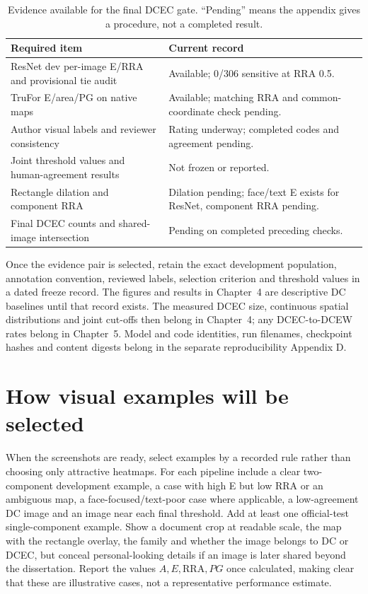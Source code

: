 \begin{table}[htbp]
\centering\small
\caption{Evidence available for the final DCEC gate. ``Pending'' means the appendix gives a procedure, not a completed result.}
\label{tab:app-clean-status}
\begin{tabularx}{\textwidth}{@{}>{\raggedright\arraybackslash}p{}>{\raggedright\arraybackslash}X@{}}
\toprule
Required item & Current record \\
\midrule
ResNet dev per-image E/RRA and provisional tie audit & Available; 0/306 sensitive at RRA 0.5. \\
TruFor E/area/PG on native maps & Available; matching RRA and common-coordinate check pending. \\
Author visual labels and reviewer consistency & Rating underway; completed codes and agreement pending. \\
Joint threshold values and human-agreement results & Not frozen or reported. \\
Rectangle dilation and component RRA & Dilation pending; face/text E exists for ResNet, component RRA pending. \\
Final DCEC counts and shared-image intersection & Pending on completed preceding checks. \\
\bottomrule
\end{tabularx}
\end{table}

Once the evidence pair is selected, retain the exact development population, annotation convention, reviewed labels, selection criterion and threshold values in a dated freeze record. The figures and results in Chapter~4 are descriptive DC baselines until that record exists. The measured DCEC size, continuous spatial distributions and joint cut-offs then belong in Chapter~4; any DCEC-to-DCEW rates belong in Chapter~5. Model and code identities, run filenames, checkpoint hashes and content digests belong in the separate reproducibility Appendix D.

\section{How visual examples will be selected}
\label{app:clean-metrics-visuals}

When the screenshots are ready, select examples by a recorded rule rather than choosing only attractive heatmaps. For each pipeline include a clear two-component development example, a case with high E but low RRA or an ambiguous map, a face-focused/text-poor case where applicable, a low-agreement DC image and an image near each final threshold. Add at least one official-test single-component example. Show a document crop at readable scale, the map with the rectangle overlay, the family and whether the image belongs to DC or DCEC, but conceal personal-looking details if an image is later shared beyond the dissertation. Report the values $A,E,\mathrm{RRA},PG$ once calculated, making clear that these are illustrative cases, not a representative performance estimate.


